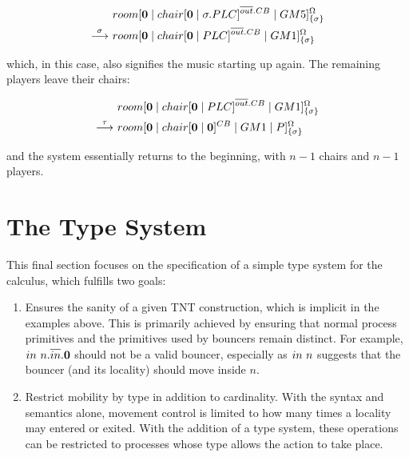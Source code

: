 \begin{equation}
\begin{aligned}
&  {room}[ \textbf{0} \;|\; {chair}[ \textbf{0} \;|\; \sigma.PLC ]^{\overline{out}.CB} \;|\;
   GM5 ]^{\Omega}_{\{\sigma\}} \\
\stackrel{\sigma}{\longrightarrow}\ & {room}[ \textbf{0} \;|\; {chair}[ \textbf{0} \;|\; PLC ]^{\overline{out}.CB} \;|\;
   GM1 ]^{\Omega}_{\{\sigma\}} 
\end{aligned}
\end{equation}

\noindent which, in this case, also signifies the music starting up again.  The
remaining players leave their chairs:

\begin{equation}
\begin{aligned}
& {room}[ \textbf{0} \;|\; {chair}[ \textbf{0} \;|\; PLC ]^{\overline{out}.CB} \;|\;
   GM1 ]^{\Omega}_{\{\sigma\}}   \\
\stackrel{\tau}{\longrightarrow}\ & {room}[ \textbf{0} \;|\; {chair}[ \textbf{0} \;|\; \textbf{0} ]^{CB} \;|\;
   GM1 \;|\; P ]^{\Omega}_{\{\sigma\}} 
\end{aligned}
\end{equation}

\noindent and the system essentially returns to the beginning, with $n -
1$ chairs and $n - 1$ players.

\section{The Type System}
\label{typesys}

This final section focuses on the specification of a simple type
system for the calculus, which fulfills two goals:

\begin{enumerate}
\item Ensures the sanity of a given TNT construction, which is
  implicit in the examples above.  This is primarily achieved by
  ensuring that normal process primitives and the primitives used by
  bouncers remain distinct.  For example,
  $in\ n.\overline{in}.\textbf{0}$ should not be a valid bouncer,
  especially as $in\ n$ suggests that the bouncer (and its locality)
  should move inside $n$.
\item Restrict mobility by type in addition to cardinality.  With the
  syntax and semantics alone, movement control is limited to how many
  times a locality may entered or exited.  With the addition of a type
  system, these operations can be restricted to processes whose type
  allows the action to take place.
\end{enumerate}

